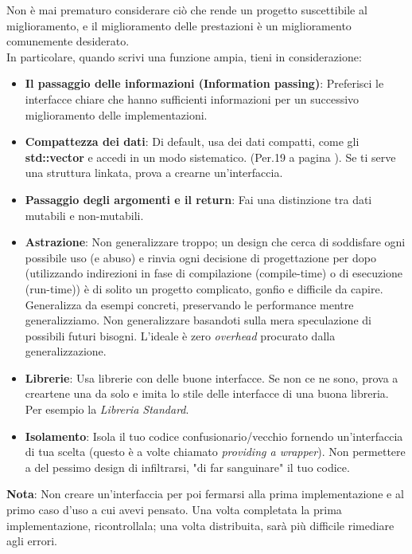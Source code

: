 \textsf{\small Non è mai prematuro considerare ciò che rende un progetto suscettibile al miglioramento, e il miglioramento delle prestazioni è un miglioramento comunemente desiderato.} \\

\textsf{\small In particolare, quando scrivi una funzione ampia, tieni in considerazione: } \\

\begin{itemize}
	\item \textsf{\small \textbf{Il passaggio delle informazioni (Information passing)}: Preferisci le interfacce chiare che hanno sufficienti informazioni per un successivo miglioramento delle implementazioni.}
	\item \textsf{\small \textbf{Compattezza dei dati}: Di default, usa dei dati compatti, come gli \textbf{std::vector} e accedi in un modo sistematico. (Per.19 a pagina \pageref{Per_19}). Se ti serve una struttura linkata, prova a crearne un'interfaccia.} %
	\item \textsf{\small \textbf{Passaggio degli argomenti e il return}: Fai una distinzione tra dati mutabili e non-mutabili.}
	\item \textsf{\small \textbf{Astrazione}: Non generalizzare troppo; un design che cerca di soddisfare ogni possibile uso (e abuso) e rinvia ogni decisione di progettazione per dopo (utilizzando indirezioni in fase di compilazione (compile-time) o di esecuzione (run-time)) è di solito un progetto complicato, gonfio e difficile da capire. Generalizza da esempi concreti, preservando le performance mentre generalizziamo. Non generalizzare basandoti sulla mera speculazione di possibili futuri bisogni. L'ideale è zero \emph{overhead} procurato dalla generalizzazione. }
	\item \textsf{\small \textbf{Librerie}: Usa librerie con delle buone interfacce. Se non ce ne sono, prova a creartene una da solo e imita lo stile delle interfacce di una buona libreria. Per esempio la \emph{Libreria Standard}.}
	\item \textsf{\small \textbf{Isolamento}: Isola il tuo codice confusionario/vecchio fornendo un'interfaccia di tua scelta (questo è a volte chiamato \emph{providing a wrapper}). Non permettere a del pessimo design di infiltrarsi, "di far sanguinare" il tuo codice.}
\end{itemize}

\textsf{\small \textbf{Nota}: Non creare un'interfaccia per poi fermarsi alla prima implementazione e al primo caso d'uso a cui avevi pensato. Una volta completata la prima implementazione, ricontrollala; una volta distribuita, sarà più difficile rimediare agli errori. } \\

